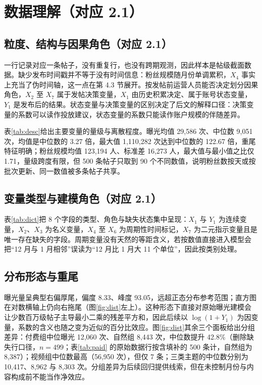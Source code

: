 \section{数据理解（对应 2.1）}


\subsection{粒度、结构与因果角色（对应 2.1）}

一行记录对应一条帖子，没有重复行，也没有跨期观测，因此样本是帖级截面数据。缺少发布时间戳并不等于没有时间信息：粉丝规模随月份单调累积，$X_4$ 事实上充当了伪时间轴，这一点在第 4.3 节展开。按发帖前运营人员能否决定划分因果角色，$X_2$ 至 $X_7$ 属于发帖决策变量，$X_1$ 由历史积累决定、属于账号状态变量，$Y_1$ 是发布后的结果。状态变量与决策变量的区别决定了后文的解释口径：决策变量的系数可以读作投放建议，状态变量的系数只能读作账户规模的伴随差异。

表\ref{tab:desc}给出主要变量的量级与离散程度。曝光均值 29,586 次、中位数 9,051 次，均值是中位数的 3.27 倍，最大值 1,110,282 次达到中位数的 122.67 倍，重尾特征明确；粉丝规模均值 123,194 人、标准差 16,273 人，最大值与最小值之比仅 1.71，量级跨度有限，但 500 条帖子只取到 90 个不同数值，说明粉丝数按天或按批次更新、同一数值被多条帖子共享。



\subsection{变量类型与建模角色（对应 2.1）}

表\ref{tab:dict}把 8 个字段的类型、角色与缺失状态集中呈现：$X_1$ 与 $Y_1$ 为连续变量，$X_2$、$X_3$ 为名义变量，$X_4$ 至 $X_6$ 为周期性时间标记，$X_7$ 为二元指示变量且是唯一存在缺失的字段。周期变量没有天然的等距含义，若按数值直接进入模型会把“12 月与 1 月相邻”误读为“12 月比 1 月大 11 个单位”，因此按类别处理。





\subsection{分布形态与重尾}

曝光量呈典型右偏厚尾，偏度 8.33、峰度 93.05，远超正态分布参考范围；直方图在对数横轴上仍向右拖尾（图\ref{fig:dist}左上）。这种形态下直接对原始曝光建模会让少数百万级帖子主导最小二乘的残差平方和，因此后续以 $\log(1+Y_1)$ 为因变量，系数的含义也随之变为近似的百分比效应。图\ref{fig:dist}其余三个面板给出分组差异：付费组中位曝光 12,060 次、自然组 8,443 次，中位数提升 42.8\%（删除缺失行口径，$n=499$；表\ref{tab:paid} 的原始数据行按含填补的 500 条计，自然组为 8,387）；视频组中位数最高（56,950 次），但仅 7 条；三类主题的中位数分别为 10,417、8,962 与 8,303 次。分组差异为后续回归提供线索，但在未控制月份与内容构成前不能当作净效应。

